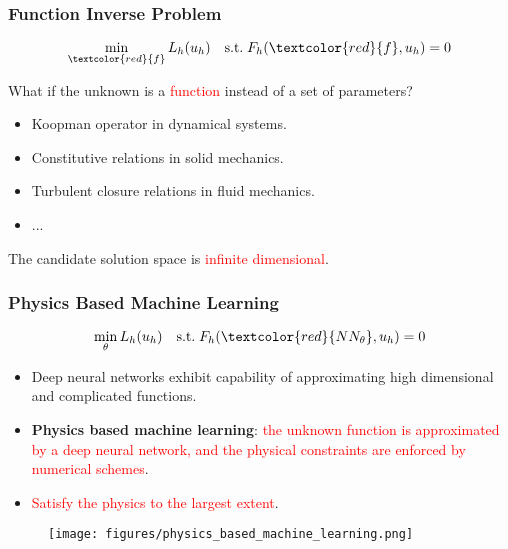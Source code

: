 \documentclass[usenames,dvipsnames]{beamer}
\begin{document}
\begin{frame}
	\frametitle{Function Inverse Problem}
	
	\begin{equation*}
		\min_{\textcolor{red}{f}} L_h(u_h) \quad \mathrm{s.t.}\; F_h(\textcolor{red}{f}, u_h) = 0
	\end{equation*}
	
	What if the unknown is a \textcolor{red}{function} instead of a set of parameters?
\begin{itemize}
	\item Koopman operator in dynamical systems.
	\item Constitutive relations in solid mechanics. 
	\item Turbulent closure relations in fluid mechanics.
	\item ...
\end{itemize}

The candidate solution space is \textcolor{red}{infinite dimensional}.

\end{frame}

\begin{frame}
	\frametitle{Physics Based Machine Learning}
	$$\min_{\theta} L_h(u_h) \quad \mathrm{s.t.}\;F_h(\textcolor{red}{NN_\theta}, u_h) = 0$$
	\vspace{-0.5cm}
	\begin{itemize}
		\item Deep neural networks exhibit capability of approximating high dimensional and complicated functions. 
		\item \textbf{Physics based machine learning}: \textcolor{red}{the unknown function is approximated by a deep neural network, and the physical constraints are enforced by numerical schemes}.
		\item \textcolor{red}{Satisfy the physics to the largest extent}.
	\end{itemize}
	\begin{figure}[hbt]
  \texttt{[image: figures/physics\_based\_machine\_learning.png]}
\end{figure}
\end{frame}
\end{document}
